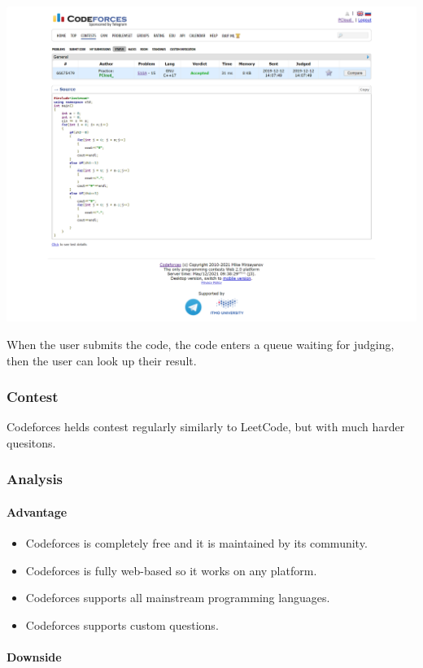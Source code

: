 \documentclass{report}
\begin{document}
\includegraphics[width=\linewidth]{Submission-66675479-Codeforces}

When the user submits the code, the code enters a queue waiting for judging, then the user can look up their result.

\subsubsection{Contest}

Codeforces helds contest regularly similarly to LeetCode, but with much harder quesitons.

\subsubsection{Analysis}

\paragraph{Advantage}

\begin{itemize}
    \item Codeforces is completely free and it is maintained by its community.
    \item Codeforces is fully web-based so it works on any platform.
    \item Codeforces supports all mainstream programming languages.
    \item Codeforces supports custom questions.
\end{itemize}

\paragraph{Downside}
\end{document}
